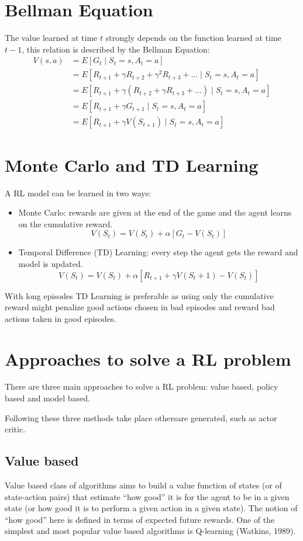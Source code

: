 \documentclass[Lau,oneside,noexaminfo]{sapthesis} %
\begin{document}
\section{Bellman Equation}
The value learned at time $t$ strongly depends on the function learned at time $t-1$, this relation is described by the Bellman Equation:
\begin{align}
V(s, a) &= E[G_t \mid S_t=s, A_t = a] \\
&= E[R_{t+1} + \gamma R_{t+2} + \gamma^2 R_{t+3} + \dots \mid S_t=s, A_t = a] \\
&= E[R_{t+1} + \gamma (R_{t+2} + \gamma R_{t+3} + \dots) \mid S_t=s, A_t = a] \\
&= E[R_{t+1} + \gamma G_{t+1} \mid S_t=s, A_t = a] \\
&= E[R_{t+1} + \gamma V(S_{t+1}) \mid S_t=s, A_t = a]
\label{bellman}
\end{align}
\section{Monte Carlo and TD Learning}
A RL model can be learned in two ways:
\begin{itemize}
	\item Monte Carlo: rewards are given at the end of the game and the agent learns on the cumulative reward.
	\begin{equation}
V( S_t ) = V( S_t ) + \alpha[ G_t - V(S_t) ]
	\end{equation}
	\item Temporal Difference (TD) Learning: every step the agent gets the reward and model is updated.
	\begin{equation}
V( S_t ) = V( S_t ) + \alpha[ R_{t+1} + \gamma V(S_t+1)- V(S_t) ]
	\end{equation}
\end{itemize}
With long episodes TD Learning is preferable as using only the cumulative reward might penalize good actions chosen in bad episodes and reward bad actions taken in good episodes.


\section{Approaches to solve a RL problem}
There are three main approaches to solve a RL problem: value based, policy based and model based. 

Following these three methods take place othersare generated, such as actor critic.
\subsection{Value based}
Value based class of algorithms aims to build a value function of states (or of state-action pairs) that estimate “how good” it is for the agent to be in a given state (or how good it is to perform a given action in a given state). The notion of “how good” here is defined in terms of expected future rewards. One of the simplest and most popular value based algorithms is Q-learning (Watkins, 1989). 
\end{document}
